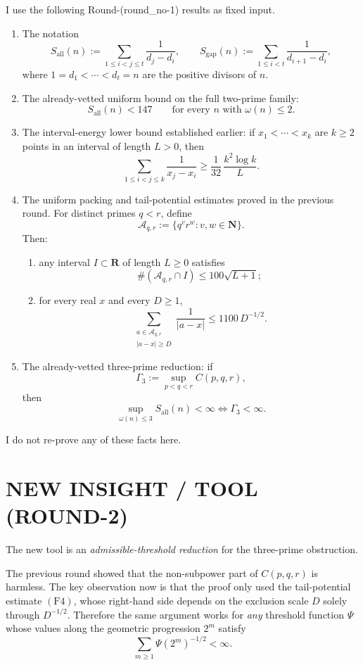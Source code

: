 I use the following Round-(round\_no-1) results as fixed input.

\begin{enumerate}
\item The notation
\[
S_{\mathrm{all}}(n):=\sum_{1\le i<j\le t}\frac{1}{d_j-d_i},
\qquad
S_{\mathrm{gap}}(n):=\sum_{1\le i<t}\frac{1}{d_{i+1}-d_i},
\]
where \(1=d_1<\cdots<d_t=n\) are the positive divisors of \(n\).

\item The already-vetted uniform bound on the full two-prime family:
\[
S_{\mathrm{all}}(n)<147
\qquad\text{for every }n\text{ with }\omega(n)\le 2.
\tag{F1}
\]

\item The interval-energy lower bound established earlier: if \(x_1<\cdots<x_k\) are \(k\ge 2\) points in an interval of length \(L>0\), then
\[
\sum_{1\le i<j\le k}\frac{1}{x_j-x_i}\ge \frac{1}{32}\,\frac{k^2\log k}{L}.
\tag{F2}
\]

\item The uniform packing and tail-potential estimates proved in the previous round. For distinct primes \(q<r\), define
\[
\mathcal A_{q,r}:=\{q^v r^w : v,w\in \mathbf N\}.
\]
Then:
\begin{enumerate}
\item any interval \(I\subset \mathbf R\) of length \(L\ge 0\) satisfies
\[
\#(\mathcal A_{q,r}\cap I)\le 100\sqrt{L+1};
\tag{F3}
\]
\item for every real \(x\) and every \(D\ge 1\),
\[
\sum_{\substack{a\in \mathcal A_{q,r}\\ |a-x|\ge D}}\frac{1}{|a-x|}
\le 1100\,D^{-1/2}.
\tag{F4}
\]
\end{enumerate}

\item The already-vetted three-prime reduction: if
\[
\Gamma_3:=\sup_{p<q<r} C(p,q,r),
\]
then
\[
\sup_{\omega(n)\le 3} S_{\mathrm{all}}(n)<\infty
\iff
\Gamma_3<\infty.
\tag{F5}
\]
\end{enumerate}

I do not re-prove any of these facts here.

\section{NEW INSIGHT / TOOL (ROUND-2)}

The new tool is an \emph{admissible-threshold reduction} for the three-prime obstruction.

The previous round showed that the non-subpower part of \(C(p,q,r)\) is harmless. The key observation now is that the proof only used the tail-potential estimate \((\mathrm{F4})\), whose right-hand side depends on the exclusion scale \(D\) solely through \(D^{-1/2}\). Therefore the same argument works for \emph{any} threshold function \(\Psi\) whose values along the geometric progression \(2^m\) satisfy
\[
\sum_{m\ge 1}\Psi(2^m)^{-1/2}<\infty.
\]

